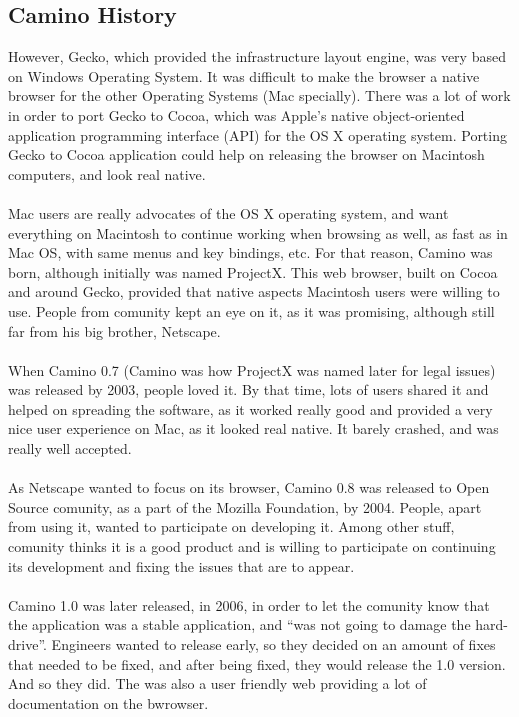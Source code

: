 \documentclass[11pt]{article}
\begin{document}
\subsection{Camino History}
However, Gecko, which provided the infrastructure layout engine, was very based on Windows Operating System. It was difficult to make the browser a native browser for the other Operating Systems (Mac specially). There was a lot of work in order to port Gecko to Cocoa, which was Apple's native object-oriented application programming interface (API) for the OS X operating system. Porting Gecko to Cocoa application could help on releasing the browser on Macintosh computers, and look real native.\\
\\
Mac users are really advocates of the OS X operating system, and want everything on Macintosh to continue working when browsing as well, as fast as in Mac OS, with same menus and key bindings, etc. For that reason, Camino was born, although initially was named ProjectX. This web browser, built on Cocoa and around Gecko, provided that native aspects Macintosh users were willing to use. People from comunity kept an eye on it, as it was promising, although still far from his big brother, Netscape.\\
\\
When Camino 0.7 (Camino was how ProjectX was named later for legal issues) was released by 2003, people loved it. By that time, lots of users shared it and helped on spreading the software, as it worked really good and provided a very nice user experience on Mac, as it looked real native. It barely crashed, and was really well accepted.\\
\\
As Netscape wanted to focus on its browser, Camino 0.8 was released to Open Source comunity, as a part of the Mozilla Foundation, by 2004. People, apart from using it, wanted to participate on developing it. Among other stuff, comunity thinks it is a good product and is willing to participate on continuing its development and fixing the issues that are to appear.\\
\\
Camino 1.0 was later released, in 2006, in order to let the comunity know that the application was a stable application, and ``was not going to damage the hard-drive''. Engineers wanted to release early, so they decided on an amount of fixes that needed to be fixed, and after being fixed, they would release the 1.0 version. And so they did. The was also a user friendly web providing a lot of documentation on the bwrowser.
\end{document}
